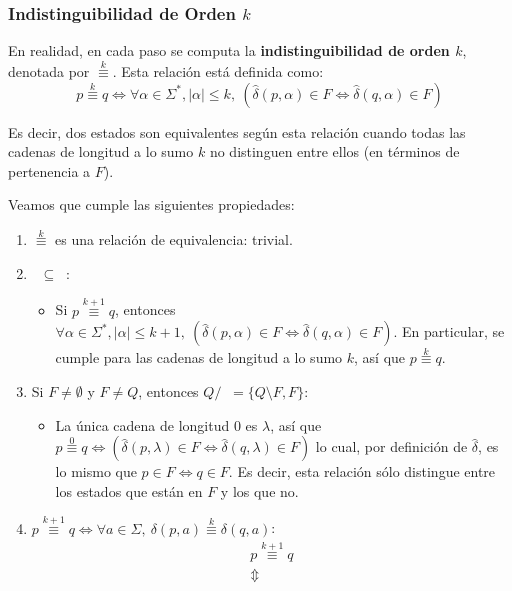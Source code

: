 \subsubsection{Indistinguibilidad de Orden $k$}

En realidad, en cada paso se computa la \textbf{indistinguibilidad de orden $k$}, denotada por $\overset{k}{\equiv}$. Esta relación está definida como:
$$
    p \overset{k}{\equiv} q \iff \forall \alpha \in \Sigma^*, |\alpha| \leq k,\ (\hat\delta(p, \alpha) \in F \iff \hat\delta(q, \alpha) \in F)
$$

Es decir, dos estados son equivalentes según esta relación cuando todas las cadenas de longitud a lo sumo $k$ no distinguen entre ellos (en términos de pertenencia a $F$).

Veamos que cumple las siguientes propiedades:
\begin{enumerate}
    \item $\overset{k}{\equiv}$ es una relación de equivalencia: trivial.
    \item $\mathop{\overset{k + 1}{\equiv}} \subseteq \mathop{\overset{k}{\equiv}}$:
          \begin{itemize}
              \item Si $p \overset{k + 1}{\equiv} q$, entonces $\forall \alpha \in \Sigma^*, |\alpha| \leq k + 1,\ (\hat\delta(p, \alpha) \in F \iff \hat\delta(q, \alpha) \in F)$. En particular, se cumple para las cadenas de longitud a lo sumo $k$, así que $p \overset{k}{\equiv} q$.
          \end{itemize}
    \item Si $F \neq \emptyset$ y $F \neq Q$, entonces $Q / \mathop{\overset{0}{\equiv}} = \{Q \setminus F, F\}$:
          \begin{itemize}
              \item La única cadena de longitud $0$ es $\lambda$, así que $p \overset{0}{\equiv} q \iff (\hat\delta(p, \lambda) \in F \iff \hat\delta(q, \lambda) \in F)$ lo cual, por definición de $\hat\delta$, es lo mismo que $p \in F \iff q \in F$. Es decir, esta relación sólo distingue entre los estados que están en $F$ y los que no.
          \end{itemize}
    \item $p \overset{k + 1}{\equiv} q \iff \forall a \in \Sigma,\ \delta(p, a) \overset{k}{\equiv} \delta(q, a)$:
          \begin{gather*}
              p \overset{k + 1}{\equiv} q \\
              \Updownarrow \\

\end{gather*}
\end{enumerate}
